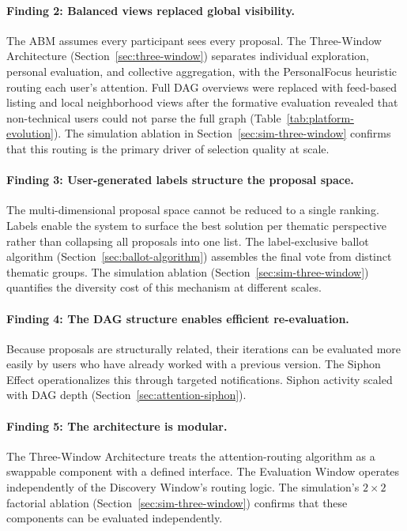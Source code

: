 \documentclass[a4paper, 12pt, twoside]{iviathesis}
\begin{document}
\paragraph{Finding 2: Balanced views replaced global visibility.}
The ABM assumes every participant sees every proposal. The Three-Window Architecture (Section~\ref{sec:three-window}) separates individual exploration, personal evaluation, and collective aggregation, with the PersonalFocus heuristic routing each user's attention. Full DAG overviews were replaced with feed-based listing and local neighborhood views after the formative evaluation revealed that non-technical users could not parse the full graph (Table~\ref{tab:platform-evolution}). The simulation ablation in Section~\ref{sec:sim-three-window} confirms that this routing is the primary driver of selection quality at scale.

\paragraph{Finding 3: User-generated labels structure the proposal space.}
The multi-dimensional proposal space cannot be reduced to a single ranking. Labels enable the system to surface the best solution per thematic perspective rather than collapsing all proposals into one list. The label-exclusive ballot algorithm (Section~\ref{sec:ballot-algorithm}) assembles the final vote from distinct thematic groups. The simulation ablation (Section~\ref{sec:sim-three-window}) quantifies the diversity cost of this mechanism at different scales.

\paragraph{Finding 4: The DAG structure enables efficient re-evaluation.}
Because proposals are structurally related, their iterations can be evaluated more easily by users who have already worked with a previous version. The Siphon Effect operationalizes this through targeted notifications. Siphon activity scaled with DAG depth (Section~\ref{sec:attention-siphon}).

\paragraph{Finding 5: The architecture is modular.}
The Three-Window Architecture treats the attention-routing algorithm as a swappable component with a defined interface. The Evaluation Window operates independently of the Discovery Window's routing logic. The simulation's $2 \times 2$ factorial ablation (Section~\ref{sec:sim-three-window}) confirms that these components can be evaluated independently.
\end{document}
